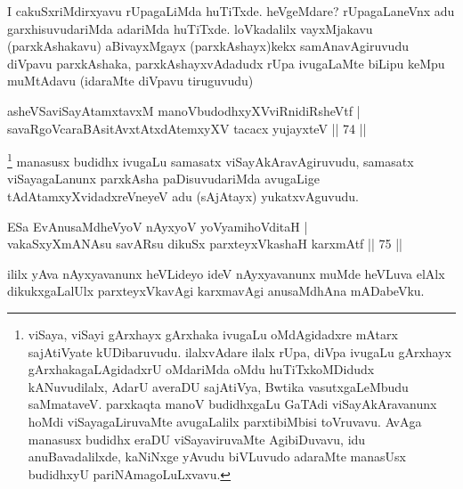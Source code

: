 \begin{artha}
I cakuSxriMdirxyavu rUpagaLiMda huTiTxde. heVgeMdare? rUpagaLaneVnx adu garxhisuvudariMda adariMda huTiTxde. loVkadalilx vayxMjakavu (parxkAshakavu) aBivayxMgayx (parxkAshayx)kekx samAnavAgiruvudu diVpavu parxkAshaka, parxkAshayxvAdadudx rUpa ivugaLaMte biLipu keMpu muMtAdavu (idaraMte diVpavu tiruguvudu)
\end{artha}


\begin{shl}
asheVSaviSayAtamxtavxM manoVbudodhxyXVviRnidiRsheVtf |\\
savaRgoVcaraBAsitAvxtAtxdAtemxyXV tacacx yujayxteV \hfill || 74 ||
\end{shl}

\begin{artha}
\footnote[1]{viSaya, viSayi gArxhayx gArxhaka ivugaLu oMdAgidadxre mAtarx sajAtiVyate kUDibaruvudu. ilalxvAdare ilalx rUpa, diVpa ivugaLu gArxhayx gArxhakagaLAgidadxrU oMdariMda oMdu huTiTxkoMDidudx kANuvudilalx, AdarU averaDU sajAtiVya, Bwtika vasutxgaLeMbudu saMmataveV. parxkaqta manoV budidhxgaLu GaTAdi viSayAkAravanunx hoMdi viSayagaLiruvaMte avugaLalilx parxtibiMbisi toVruvavu. AvAga manasusx budidhx eraDU viSayaviruvaMte AgibiDuvavu, idu anuBavadalilxde, kaNiNxge yAvudu biVLuvudo adaraMte manasUsx budidhxyU pariNAmagoLuLxvavu.} manasusx budidhx ivugaLu samasatx viSayAkAravAgiruvudu, samasatx viSayagaLanunx parxkAsha paDisuvudariMda avugaLige tAdAtamxyXvidadxreVneyeV adu (sAjAtayx) yukatxvAguvudu.
\end{artha}


\begin{shl}
ESa EvAnusaMdheVyoV nAyxyoV yoV\s yamihoVditaH |\\
vakaSxyXmANAsu savARsu dikuSx parxteyxVkashaH karxmAtf \hfill || 75 ||
\end{shl}

\begin{artha}
ililx yAva nAyxyavanunx heVLideyo ideV nAyxyavanunx muMde heVLuva elAlx dikukxgaLalUlx parxteyxVkavAgi karxmavAgi anusaMdhAna mADabeVku.
\end{artha}


